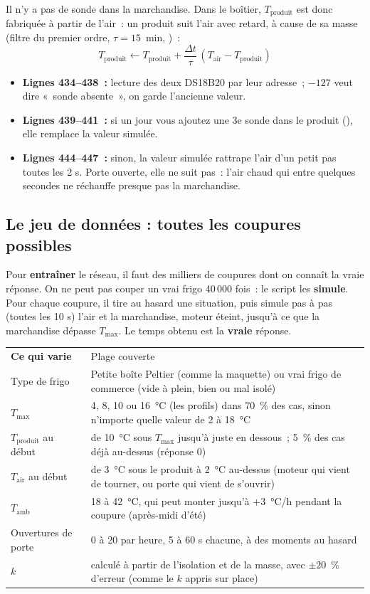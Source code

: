 Il n'y a pas de sonde dans la marchandise. Dans le boîtier, $T_{\text{produit}}$ est donc fabriquée à partir de l'air~: un produit suit l'air avec retard, à cause de sa masse (filtre du premier ordre, $\tau = 15$~min, )~:
\[ T_{\text{produit}} \leftarrow T_{\text{produit}} + \frac{\Delta t}{\tau}\,(T_{\text{air}} - T_{\text{produit}}) \]

\begin{itemize}
  \item \textbf{Lignes 434--438~:} lecture des deux DS18B20 par leur adresse~; $-127$ veut dire «~sonde absente~», on garde l'ancienne valeur.
  \item \textbf{Lignes 439--441~:} si un jour vous ajoutez une 3e sonde dans le produit (), elle remplace la valeur simulée.
  \item \textbf{Lignes 444--447~:} sinon, la valeur simulée rattrape l'air d'un petit pas toutes les 2 s. Porte ouverte, elle ne suit pas~: l'air chaud qui entre quelques secondes ne réchauffe presque pas la marchandise.
\end{itemize}

\subsection{Le jeu de données : toutes les coupures possibles}
Pour \textbf{entraîner} le réseau, il faut des milliers de coupures dont on connaît la vraie réponse. On ne peut pas couper un vrai frigo 40\,000 fois~: le script  les \textbf{simule}. Pour chaque coupure, il tire au hasard une situation, puis simule pas à pas (toutes les 10 s) l'air et la marchandise, moteur éteint, jusqu'à ce que la marchandise dépasse $T_{\max}$. Le temps obtenu est la \textbf{vraie} réponse.

\begin{tabularx}{\linewidth}{P{4.2cm}L}
 \textbf{Ce qui varie} & Plage couverte \\
Type de frigo & Petite boîte Peltier (comme la maquette) ou vrai frigo de commerce (vide à plein, bien ou mal isolé) \\
$T_{\max}$ & 4, 8, 10 ou 16~°C (les profils) dans 70~\% des cas, sinon n'importe quelle valeur de 2 à 18~°C \\
$T_{\text{produit}}$ au début & de 10~°C sous $T_{\max}$ jusqu'à juste en dessous~; 5~\% des cas déjà au-dessus (réponse 0) \\
$T_{\text{air}}$ au début & de 3~°C sous le produit à 2~°C au-dessus (moteur qui vient de tourner, ou porte qui vient de s'ouvrir) \\
$T_{\text{amb}}$ & 18 à 42~°C, qui peut monter jusqu'à +3~°C/h pendant la coupure (après-midi d'été) \\
Ouvertures de porte & 0 à 20 par heure, 5 à 60 s chacune, à des moments au hasard \\
$k$ & calculé à partir de l'isolation et de la masse, avec $\pm 20$~\% d'erreur (comme le $k$ appris sur place) \\
\end{tabularx}


